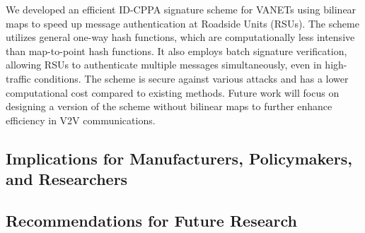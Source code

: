 We developed an efficient ID-CPPA signature scheme for VANETs using bilinear maps to speed up message authentication at Roadside Units (RSUs).
The scheme utilizes general one-way hash functions, which are computationally less intensive than map-to-point hash functions.
It also employs batch signature verification, allowing RSUs to authenticate multiple messages simultaneously, even in high-traffic conditions.
The scheme is secure against various attacks and has a lower computational cost compared to existing methods.
Future work will focus on designing a version of the scheme without bilinear maps to further enhance efficiency in V2V communications.





\subsection{Implications for Manufacturers, Policymakers, and Researchers}\label{subsec:implications-for-manufacturers-policymakers-and-researchers}
\subsection{Recommendations for Future Research}\label{subsec:recommendations-for-future-research}
